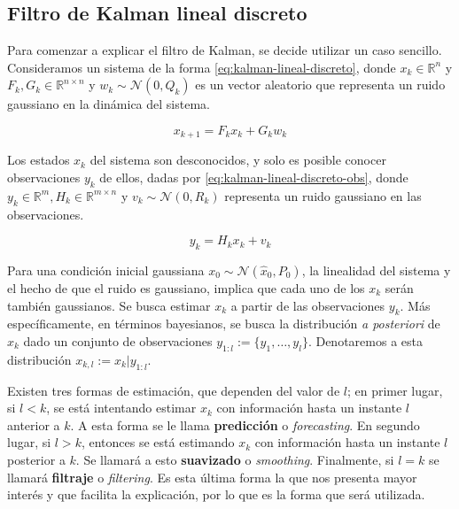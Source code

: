 \subsection{Filtro de Kalman lineal discreto}\label{filtro-lineal}

Para comenzar a explicar el filtro de Kalman, se decide utilizar un caso sencillo. Consideramos un sistema de la forma \ref{eq:kalman-lineal-discreto}, donde \(x_k \in \mathbb{R}^{n}\) y \(F_k, G_k \in \mathbb{R}^{n \times n}\) y \(w_k \sim \mathcal{N}(0,Q_k)\) es un vector aleatorio que representa un ruido gaussiano en la dinámica del sistema. 

\begin{equation}\label{eq:kalman-lineal-discreto}
x_{k+1} = F_k x_k + G_k w_k
\end{equation}

Los estados \(x_k\) del sistema son desconocidos, y solo es posible conocer observaciones \(y_k\) de ellos, dadas por \ref{eq:kalman-lineal-discreto-obs}, donde \(y_k \in \mathbb{R}^{m}, H_k \in \mathbb{R}^{m \times n}\) y \( v_k \sim \mathcal{N}(0, R_k)\) representa un ruido gaussiano en las observaciones.

\begin{equation}\label{eq:kalman-lineal-discreto-obs}
y_k = H_k x_k  + v_k
\end{equation}


Para una condición inicial gaussiana \(x_0 \sim \mathcal{N}(\hat{x}_0, P_0)\), la linealidad del sistema y el hecho de que el ruido es gaussiano, implica que cada uno de los \(x_k\) serán también gaussianos. Se busca estimar \(x_k\) a partir de las observaciones \(y_k\). Más específicamente, en términos bayesianos, se busca la distribución \textit{a posteriori} de \(x_k\) dado un conjunto de observaciones \(y_{1:l} := \{y_1, \dots, y_l\}\). Denotaremos a esta distribución \(x_{k,l}:= x_k | y_{1:l}\).

Existen tres formas de estimación, que dependen del valor de \(l\); en primer lugar, si \(l < k\), se está intentando estimar \(x_k\) con información hasta un instante \(l\) anterior a \(k\). A esta forma se le llama \textbf{predicción} o \textit{forecasting}. En segundo lugar, si \(l>k\), entonces se está estimando \(x_k\) con información hasta un instante \(l\) posterior a \(k\). Se llamará a esto \textbf{suavizado} o \textit{smoothing}. Finalmente, si \(l = k\) se llamará \textbf{filtraje} o \textit{filtering}. Es esta última forma la que nos presenta mayor interés y que facilita la explicación, por lo que es la forma que será utilizada.


